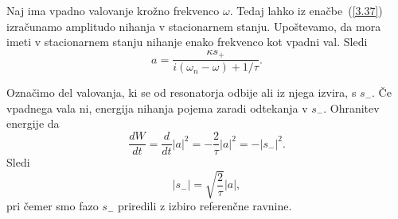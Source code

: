 Naj ima vpadno valovanje krožno  frekvenco $\omega$. Tedaj lahko iz enačbe~(\ref{3.37}) 
izračunamo amplitudo nihanja v stacionarnem stanju. Upoštevamo, 
da mora imeti v stacionarnem stanju nihanje enako frekvenco
kot vpadni val. Sledi 
\begin{equation}
a=\frac{\kappa s_{+}}{i(\omega_{n}-\omega)+1/\tau}.
\label{3.38}
\end{equation}
 
Označimo del valovanja, ki se od resonatorja odbije ali iz njega izvira, s $s_{-}$.
Če vpadnega vala ni, energija nihanja pojema zaradi odtekanja v $s_{-}$.
Ohranitev energije da 
\begin{equation}
\frac{dW}{dt}=\frac{d}{dt}|a|^{2}=-\frac{2}{\tau}|a|^{2}=-|s_{-}|^{2}.
\label{3.39}
\end{equation}
Sledi
\begin{equation}
|s_{-}|=\sqrt{\frac{2}{\tau}}|a|,
\label{3.40}
\end{equation}
pri čemer smo fazo $s_{-}$ priredili z izbiro referenčne ravnine.

